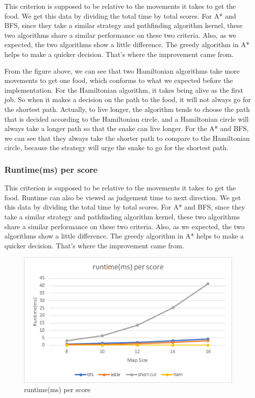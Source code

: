 \documentclass[12pt]{article}
\begin{document}
This criterion is supposed to be relative to the movements it takes to get the food. We get 
this data by dividing the total time by total scores. For A* and BFS, since they take a similar 
strategy and pathfinding algorithm kernel, these two algorithms share a similar performance on 
these two criteria. Also, as we expected, the two algorithms show a little difference. The 
greedy algorithm in A* helps to make a quicker decision. That's where the improvement came from. 

From the figure above, we can see that two Hamiltonian algorithms take more movements to get one food, which conforms to what we expected before the implementation. For the Hamiltonian algorithm, it takes being alive as the first job. So when it makes a decision on the path to the food, it will not always go for the shortest path. Actually, to live longer, the algorithm tends to choose the path that is decided according to the Hamiltonian circle, and a Hamiltonian circle will always take a longer path so that the snake can live longer. For the A* and BFS, we can see that they always take the shorter path to compare to the Hamiltonian circle, because the strategy will urge the snake to go for the shortest path. 

\subsubsection{Runtime(ms) per score}

This criterion is supposed to be relative to the movements it takes to get the food. Runtime can also be viewed as judgement time to next direction. We get this data by dividing the total time by total scores. For A* and BFS, since they take a similar strategy and pathfinding algorithm kernel, these two algorithms share a similar performance on these two criteria. Also, as we expected, the two algorithms show a little difference. The greedy algorithm in A* helps to make a quicker decision. That's where the improvement came from. 

\begin{figure}[H]
    \centering 
    \includegraphics[scale = 0.9]{anay2.png}
    \caption{runtime(ms) per score}
\end{figure}
\end{document}
